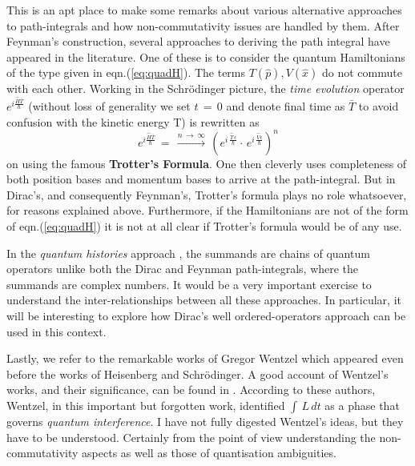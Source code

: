 \documentclass[a4paper]{JHEP3}
\newcommand{\be}{\begin{equation}}
\newcommand{\ee}{\end{equation}}
\begin{document}
This is an apt place to make some remarks about various alternative approaches to path-integrals and how non-commutativity issues are
handled by them. After Feynman's construction, several approaches to deriving the path integral have appeared in the literature. One
of these is to consider the quantum Hamiltonians of the type given in eqn.(\ref{eq:quadH}). The terms $T({\hat p}),V({\hat x})$
do not commute with each other. Working in the Schr\"odinger picture, the \emph{time evolution} operator $e^{i\frac{{\hat H}{\bar T}}{\hbar}}$
(without loss of generality we set $t\,=\,0$ and denote final time as ${\bar T}$ to avoid confusion with the kinetic energy T) is rewritten as
\be
\label{eq:slicedTevol}
e^{i\frac{{\hat H}{\bar T}}{\hbar}}\,=\,\xrightarrow{n\,\rightarrow\,\infty}\,(e^{i\,\frac{{\hat T}\,\epsilon}{\hbar}}\cdot\,
e^{i\,\frac{{\hat V}\epsilon}{\hbar}})^n
\ee
on using the famous {\bf Trotter's Formula}. One then cleverly uses completeness of both position bases and momentum bases to arrive
at the path-integral. But in Dirac's, and consequently Feynman's, Trotter's formula plays no role whatsoever, for reasons explained above. 
Furthermore, if the Hamiltonians
are not of the form of eqn.(\ref{eq:quadH}) it is not at all clear if Trotter's formula would be of any use.

In the \emph{quantum histories} approach \cite{griffiths,histories}, the summands are chains of quantum operators unlike both the Dirac 
and Feynman 
path-integrals, where the summands are complex numbers. It would be a very important exercise to understand the inter-relationships between
all these approaches. In particular, it will be interesting to explore how Dirac's well ordered-operators approach can be used in this context.

Lastly, we refer to the remarkable works of Gregor Wentzel \cite{wentzel1,wentzel2} which appeared even before the works of Heisenberg and 
Schr\"odinger. A good account of Wentzel's works, and their significance, can be found in \cite{antoci}. According to these authors, Wentzel,
in this important but forgotten work, identified $\int\,L\,dt$ as a phase that governs \emph{quantum interference}. I have not fully
digested Wentzel's ideas, but they have to be understood. Certainly from the point of view understanding the non-commutativity aspects as well
as those of quantisation ambiguities.
\end{document}
